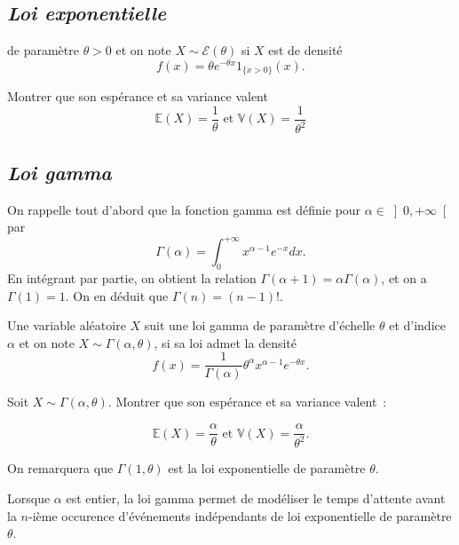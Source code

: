 
\subsection*{\emph{Loi exponentielle}}\label{II-loi-exponentielle}

de paramètre \(\theta > 0\) et on note \(X \sim \mathcal{E}(\theta)\) si
\(X\) est de densité \[ f(x) = \theta e^{-\theta x} 1_{\{x>0\}} (x).\]

\label{II-moments-expo}
Montrer que son espérance et sa variance valent
\[ \mathbb{E}(X) = \frac{1}{\theta} \text{ et } \mathbb{V}(X) = \frac{1}{\theta^2}\]

\subsection*{\emph{Loi gamma}}\label{II-loi-gamma}

On rappelle tout d'abord que la fonction gamma est définie pour
\(\alpha \in \left] 0, + \infty \right[\) par
\[\Gamma(\alpha) = \int_0^{+\infty} x^{\alpha-1}e^{-x} dx.\] En
intégrant par partie, on obtient la relation
\(\Gamma(\alpha+1) = \alpha \Gamma(\alpha)\), et on a \(\Gamma(1) = 1\).
On en déduit que \(\Gamma(n) = (n-1)!\).

Une variable aléatoire \(X\) suit une loi gamma de paramètre d'échelle
\(\theta\) et d'indice \(\alpha\) et on note
\(X \sim \Gamma(\alpha,\theta)\), si sa loi admet la densité
\[f(x) = \frac{1}{\Gamma(\alpha)}\theta^\alpha x^{\alpha -1} e^{-\theta x}.\]

\label{II-moments-gamma}
Soit \(X\sim \Gamma(\alpha,\theta)\). Montrer que son espérance et sa
variance valent~:

\[ \mathbb{E}(X) = \frac{\alpha}{\theta} \text{ et } \mathbb{V}(X) = \frac{\alpha}{\theta^2}.\]

On remarquera que \(\Gamma(1,\theta)\) est la loi exponentielle de
paramètre \(\theta\).

Lorsque \(\alpha\) est entier, la loi gamma permet de modéliser le temps
d'attente avant la \(n\)-ième occurence d'événements indépendants de loi
exponentielle de paramètre \(\theta\).

